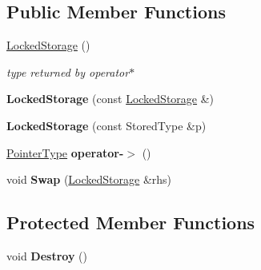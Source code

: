 \subsection*{Public Member Functions}
\begin{DoxyCompactItemize}
\item 
\hypertarget{classLoki_1_1LockedStorage_a8a214aaa9bd4d0ed532b9b5a338cb96e}{}\hyperlink{classLoki_1_1LockedStorage_a8a214aaa9bd4d0ed532b9b5a338cb96e}{Locked\+Storage} ()\label{classLoki_1_1LockedStorage_a8a214aaa9bd4d0ed532b9b5a338cb96e}

\begin{DoxyCompactList}\small\item\em type returned by operator$\ast$ \end{DoxyCompactList}\item 
\hypertarget{classLoki_1_1LockedStorage_aa460382a07ef115bca46f97ab48d2488}{}{\bfseries Locked\+Storage} (const \hyperlink{classLoki_1_1LockedStorage}{Locked\+Storage} \&)\label{classLoki_1_1LockedStorage_aa460382a07ef115bca46f97ab48d2488}

\item 
\hypertarget{classLoki_1_1LockedStorage_a6385d862cc4540021a9231b6d1675d7a}{}{\bfseries Locked\+Storage} (const Stored\+Type \&p)\label{classLoki_1_1LockedStorage_a6385d862cc4540021a9231b6d1675d7a}

\item 
\hypertarget{classLoki_1_1LockedStorage_a341cdab8a282dc62f338d419bde32c26}{}\hyperlink{classLoki_1_1LockedStorage_a88844c5eb40b576359da4234b76702d8}{Pointer\+Type} {\bfseries operator-\/$>$} ()\label{classLoki_1_1LockedStorage_a341cdab8a282dc62f338d419bde32c26}

\item 
\hypertarget{classLoki_1_1LockedStorage_a1157c51679f248d2ada5fce538270deb}{}void {\bfseries Swap} (\hyperlink{classLoki_1_1LockedStorage}{Locked\+Storage} \&rhs)\label{classLoki_1_1LockedStorage_a1157c51679f248d2ada5fce538270deb}

\end{DoxyCompactItemize}
\subsection*{Protected Member Functions}
\begin{DoxyCompactItemize}
\item 
\hypertarget{classLoki_1_1LockedStorage_af08d28ecd4dc64596ee5c5ae4578ff01}{}void {\bfseries Destroy} ()\label{classLoki_1_1LockedStorage_af08d28ecd4dc64596ee5c5ae4578ff01}

\end{DoxyCompactItemize}
